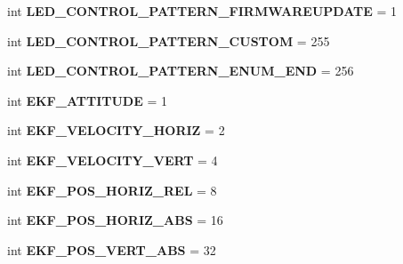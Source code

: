 \begin{DoxyCompactItemize}
int {\bfseries L\+E\+D\+\_\+\+C\+O\+N\+T\+R\+O\+L\+\_\+\+P\+A\+T\+T\+E\+R\+N\+\_\+\+F\+I\+R\+M\+W\+A\+R\+E\+U\+P\+D\+A\+TE} = 1
\item 
\mbox{\label{namespacepymavlink_1_1dialects_1_1v10_a6e87897cc5c8a6849aa9615cbf1cbf30}} 
int {\bfseries L\+E\+D\+\_\+\+C\+O\+N\+T\+R\+O\+L\+\_\+\+P\+A\+T\+T\+E\+R\+N\+\_\+\+C\+U\+S\+T\+OM} = 255
\item 
\mbox{\label{namespacepymavlink_1_1dialects_1_1v10_ae0a5439009076a7961e7910b9027f909}} 
int {\bfseries L\+E\+D\+\_\+\+C\+O\+N\+T\+R\+O\+L\+\_\+\+P\+A\+T\+T\+E\+R\+N\+\_\+\+E\+N\+U\+M\+\_\+\+E\+ND} = 256
\item 
\mbox{\label{namespacepymavlink_1_1dialects_1_1v10_a98c2180512877ac5913e9bbecc45150b}} 
int {\bfseries E\+K\+F\+\_\+\+A\+T\+T\+I\+T\+U\+DE} = 1
\item 
\mbox{\label{namespacepymavlink_1_1dialects_1_1v10_aad405a714c5232a5716b3c4405162860}} 
int {\bfseries E\+K\+F\+\_\+\+V\+E\+L\+O\+C\+I\+T\+Y\+\_\+\+H\+O\+R\+IZ} = 2
\item 
\mbox{\label{namespacepymavlink_1_1dialects_1_1v10_ad4a64002d6c0ca0c17f00be6e59ea8c6}} 
int {\bfseries E\+K\+F\+\_\+\+V\+E\+L\+O\+C\+I\+T\+Y\+\_\+\+V\+E\+RT} = 4
\item 
\mbox{\label{namespacepymavlink_1_1dialects_1_1v10_ad6325d01842b9cd97d09ceefcb4d3c0a}} 
int {\bfseries E\+K\+F\+\_\+\+P\+O\+S\+\_\+\+H\+O\+R\+I\+Z\+\_\+\+R\+EL} = 8
\item 
\mbox{\label{namespacepymavlink_1_1dialects_1_1v10_aebc385d3c52e4d30231d962239c48ebe}} 
int {\bfseries E\+K\+F\+\_\+\+P\+O\+S\+\_\+\+H\+O\+R\+I\+Z\+\_\+\+A\+BS} = 16
\item 
\mbox{\label{namespacepymavlink_1_1dialects_1_1v10_a6a73cc75f23f971ab720bae8b3d735eb}} 
int {\bfseries E\+K\+F\+\_\+\+P\+O\+S\+\_\+\+V\+E\+R\+T\+\_\+\+A\+BS} = 32
\item 
\mbox{\label{namespacepymavlink_1_1dialects_1_1v10_abc06fd2a931eb9e5e3caf7f8f83ff49d}} 

\end{DoxyCompactItemize}
